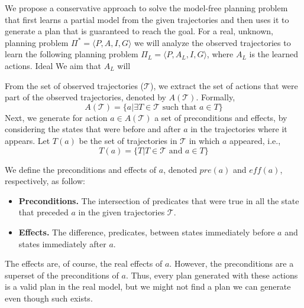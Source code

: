 \documentclass[letterpaper]{article}
\begin{document}


We propose a conservative approach to solve the model-free planning problem
that first learns a partial model from the given trajectories and then uses it to generate a plan that is guaranteed to reach the goal. For a real, unknown, planning problem $\Pi^*=\langle P,A,I,G\rangle$ we will analyze the observed trajectories to learn the following planning problem $\Pi_L=\langle P,A_L,I,G\rangle$, where $A_L$ is the learned actions. 
Ideal
We aim that $A_L$ will 


From the set of observed trajectories ($\mathcal{T}$), we extract the set of actions that were part of the observed trajectories, 
denoted by $A(\mathcal{T})$. Formally,
\[ A(\mathcal{T})=\{a | \exists T\in\mathcal{T} \text{~such that~} a\in T\} \]
Next, we generate for action $a\in A(\mathcal{T})$ a set of preconditions and effects, by considering the states that were before and after $a$ in the trajectories where it appears. 
Let $T(a)$ be the set of trajectories in $\mathcal{T}$ in which $a$ appeared, i.e., 
\[ T(a)=\{T | T\in \mathcal{T} \text{~and~} a\in T\} \]


We define the preconditions and effects of $a$, denoted $pre(a)$ and $eff(a)$, respectively, as follow:
\begin{itemize}
    \item {\bf Preconditions.} The intersection of predicates that were true in all the state that preceded $a$ in the given trajectories $\mathcal{T}$. 
    \item {\bf Effects.} The difference, predicates, between states immediately before $a$ and states immediately after $a$. 
\end{itemize}

The effects are, of course, the real effects of $a$. However, the preconditions are a superset of the preconditions of $a$. Thus, every plan generated with these actions is a valid plan in the real model, but we might not find a plan we can generate even though such exists. 
\end{document}
